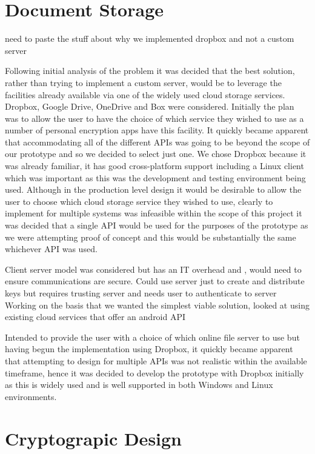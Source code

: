 \section{Document Storage}

need to paste the stuff about why we implemented dropbox and not a custom server

Following initial analysis of the problem it was decided that the best solution, rather than trying to implement a custom server, would be to leverage the facilities already available via one of the widely used cloud storage services.  Dropbox, Google Drive, OneDrive and Box were considered.  Initially the plan was to allow the user to have the choice of which service they wished to use as a number of personal encryption apps have this facility.  It quickly became apparent that accommodating all of the different APIs was going to be beyond the scope of our prototype and so we decided to select just one.  We chose Dropbox because it was already familiar, it has good cross-platform support including a Linux client which was important as this was the development and testing environment being used.  Although in the production level design it would be desirable to allow the user to choose which cloud storage service they wished to use, clearly to implement for multiple systems was infeasible within the scope of this project it was decided that a single API would be used for the purposes of the prototype as we were attempting proof of concept and this would be substantially the same whichever API was used.

Client server model was considered but has an IT overhead and , would need to ensure communications are secure.  Could use server just to create and distribute keys but requires trusting server and needs user to authenticate to server
Working on the basis that we wanted the simplest viable solution, looked at using existing cloud services that offer an android API

Intended to provide the user with a choice of which online file server to use but having begun the implementation using Dropbox, it quickly became apparent that attempting to design for multiple APIs was not realistic within the available timeframe, hence it was decided to develop the prototype with Dropbox initially as this is widely used and is well supported in both Windows and Linux environments. 
\section{Cryptograpic Design}


